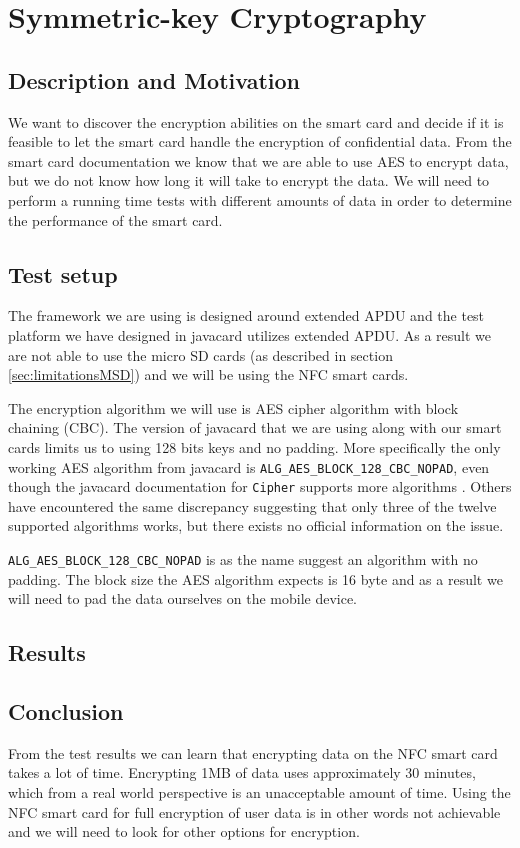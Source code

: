 \section{Symmetric-key Cryptography}
\subsection{Description and Motivation}
We want to discover the encryption abilities on the smart card and decide if it is feasible to let the smart card handle the encryption of confidential data. From the smart card documentation we know that we are able to use AES to encrypt data, but we do not know how long it will take to encrypt the data. We will need to perform a running time tests with different amounts of data in order to determine the performance of the smart card.

\subsection{Test setup}
The framework we are using is designed around extended APDU and the test platform we have designed in javacard utilizes extended APDU. As a result we are not able to use the micro SD cards (as described in section \ref{sec:limitationsMSD}) and we will be using the NFC smart cards.

The encryption algorithm we will use is AES cipher algorithm with block chaining (CBC). The version of javacard that we are using along with our smart cards limits us to using 128 bits keys and no padding. More specifically the only working AES algorithm from javacard is \texttt{ALG\_AES\_BLOCK\_128\_CBC\_NOPAD}, even though the javacard documentation for \texttt{Cipher} supports more algorithms \cite{javacardCipher}. Others have encountered the same discrepancy \cite{javacardCipherFail} suggesting that only three of the twelve supported algorithms works, but there exists no official information on the issue.

\texttt{ALG\_AES\_BLOCK\_128\_CBC\_NOPAD} is as the name suggest an algorithm with no padding. The block size the AES algorithm expects is 16 byte and as a result we will need to pad the data ourselves on the mobile device.

\subsection{Results}


\subsection{Conclusion}
From the test results we can learn that encrypting data on the NFC smart card takes a lot of time. Encrypting 1MB of data uses approximately 30 minutes, which from a real world perspective is an unacceptable amount of time. Using the NFC smart card for full encryption of user data is in other words not achievable and we will need to look for other options for encryption.

